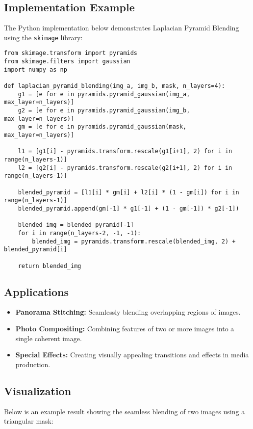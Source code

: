 \subsection*{Implementation Example}
The Python implementation below demonstrates Laplacian Pyramid Blending using the \texttt{skimage} library:

\begin{verbatim}
from skimage.transform import pyramids
from skimage.filters import gaussian
import numpy as np

def laplacian_pyramid_blending(img_a, img_b, mask, n_layers=4):
    g1 = [e for e in pyramids.pyramid_gaussian(img_a, max_layer=n_layers)]
    g2 = [e for e in pyramids.pyramid_gaussian(img_b, max_layer=n_layers)]
    gm = [e for e in pyramids.pyramid_gaussian(mask, max_layer=n_layers)]

    l1 = [g1[i] - pyramids.transform.rescale(g1[i+1], 2) for i in range(n_layers-1)]
    l2 = [g2[i] - pyramids.transform.rescale(g2[i+1], 2) for i in range(n_layers-1)]

    blended_pyramid = [l1[i] * gm[i] + l2[i] * (1 - gm[i]) for i in range(n_layers-1)]
    blended_pyramid.append(gm[-1] * g1[-1] + (1 - gm[-1]) * g2[-1])

    blended_img = blended_pyramid[-1]
    for i in range(n_layers-2, -1, -1):
        blended_img = pyramids.transform.rescale(blended_img, 2) + blended_pyramid[i]

    return blended_img
\end{verbatim}

\subsection*{Applications}
\begin{itemize}
    \item \textbf{Panorama Stitching:} Seamlessly blending overlapping regions of images.
    \item \textbf{Photo Compositing:} Combining features of two or more images into a single coherent image.
    \item \textbf{Special Effects:} Creating visually appealing transitions and effects in media production.
\end{itemize}

\subsection*{Visualization}
Below is an example result showing the seamless blending of two images using a triangular mask:

